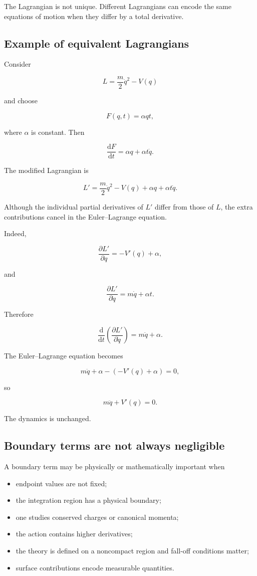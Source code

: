 The Lagrangian is not unique. Different Lagrangians can encode the same equations of motion when they differ by a total derivative.

\subsection{Example of equivalent Lagrangians}

Consider

\[
L
=
\frac{m}{2}\dot q^{2}-V(q)
\]

and choose

\[
F(q,t)=\alpha q t,
\]

where \(\alpha\) is constant. Then

\[
\frac{\mathrm{d}F}{\mathrm{d}t}
=
\alpha q+\alpha t\dot q.
\]

The modified Lagrangian is

\[
L'
=
\frac{m}{2}\dot q^{2}-V(q)
+
\alpha q+\alpha t\dot q.
\]

Although the individual partial derivatives of \(L'\) differ from those of \(L\), the extra contributions cancel in the Euler--Lagrange equation.

Indeed,

\[
\frac{\partial L'}{\partial q}
=
-V'(q)+\alpha,
\]

and

\[
\frac{\partial L'}{\partial\dot q}
=
m\dot q+\alpha t.
\]

Therefore

\[
\frac{\mathrm{d}}{\mathrm{d}t}
\left(
\frac{\partial L'}{\partial\dot q}
\right)
=
m\ddot q+\alpha.
\]

The Euler--Lagrange equation becomes

\[
m\ddot q+\alpha-(-V'(q)+\alpha)=0,
\]

so

\[
m\ddot q+V'(q)=0.
\]

The dynamics is unchanged.

\subsection{Boundary terms are not always negligible}

A boundary term may be physically or mathematically important when

\begin{itemize}
    \item endpoint values are not fixed;
    \item the integration region has a physical boundary;
    \item one studies conserved charges or canonical momenta;
    \item the action contains higher derivatives;
    \item the theory is defined on a noncompact region and fall-off conditions matter;
    \item surface contributions encode measurable quantities.
\end{itemize}

